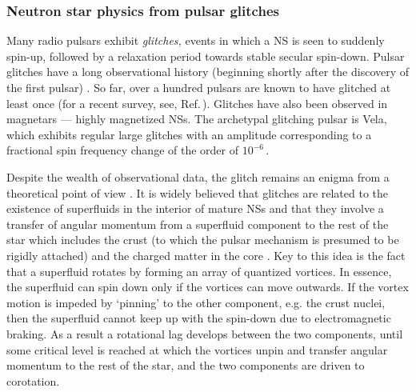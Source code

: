 \FloatBarrier
\subsubsection{Neutron star physics from pulsar glitches}

Many radio pulsars exhibit {\em glitches,} events in which 
a NS is seen to suddenly spin-up, followed by a relaxation period towards
stable secular spin-down. Pulsar glitches have a long observational 
history (beginning shortly after the discovery of the first pulsar)
\cite{Anderson:1975}. 
So far, over a hundred pulsars are known to have glitched at least once
(for a recent survey, see, Ref.\,\cite{Espinoza:2011pq}).
Glitches have also been observed in magnetars --- highly magnetized NSs.
The archetypal glitching pulsar is Vela, which exhibits regular
large glitches with an amplitude corresponding to a fractional spin 
frequency change of the order of $10^{-6}$\,\cite{Ruderman:1976}.

Despite the wealth of observational data, the glitch
remains an enigma from a theoretical point of view \cite{McDonald:2007}. 
It is widely 
believed that glitches are related to the existence of superfluids 
in the interior of mature NSs and that they involve a transfer 
of angular momentum from a superfluid component to the rest of the 
star which includes the crust (to which the pulsar mechanism is presumed 
to be rigidly attached) and the charged matter in the 
core \cite{Anderson:1975, McDonald:2007}.  Key to this idea is the fact that 
a superfluid rotates by forming an array of quantized vortices. 
In essence, the superfluid can spin down only if
the vortices can move outwards.  If the vortex motion 
is impeded by `pinning' to the other component, e.g. the crust nuclei, 
then the superfluid 
cannot keep up with the spin-down due to electromagnetic braking. 
As a result a rotational lag develops between the two components,
until some critical level is reached at which the vortices unpin and 
transfer angular momentum to the rest of the star, and the two 
components are driven to corotation.

